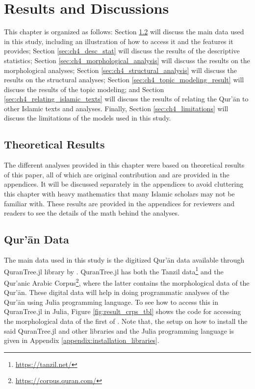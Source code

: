\chapter{Results and Discussions}\label{ch:results}
This chapter is organized as follows: Section \ref{sec:result_data} will discuss the main data used in this study, including an illustration of how to access it and the features it provides; Section \ref{sec:ch4_desc_stat} will discuss the results of the descriptive statistics; Section \ref{sec:ch4_morphological_analysis} will discuss the results on the morphological analyses; Section \ref{sec:ch4_structural_analysis} will discuss the results on the structural analyses; Section \ref{sec:ch4_topic_modeling_result} will discuss the results of the topic modeling; and Section \ref{sec:ch4_relating_islamic_texts} will discuss the results of relating the Qur'\=an to other Islamic texts and analyses. Finally, Section \ref{sec:ch4_limitations} will discuss the limitations of the models used in this study.
\section{Theoretical Results}
The different analyses provided in this chapter were based on theoretical results of this paper, all of which are original contribution and are provided in the appendices. It will be discussed separately in the appendices to avoid cluttering this chapter with heavy mathematics that many Islamic scholars may not be familiar with. These results are provided in the appendices for reviewers and readers to see the details of the math behind the analyses.
\section{Qur'\=an Data}\label{sec:result_data}
The main data used in this study is the digitized Qur'\=an data available through QuranTree.jl library by . QuranTree.jl has both the Tanzil data\footnote{\url{https://tanzil.net/}} and the Qur'anic Arabic Corpus\footnote{\url{https://corpus.quran.com/}}, where the latter contains the morphological data of the Qur'\=an. These digital data will help in doing programmatic analyses of the Qur'\=an using Julia programming language. To see how to access this in QuranTree.jl in Julia, Figure \ref{fig:result_crps_tbl} shows the code for accessing the morphological data of the first   of  . Note that, the setup on how to install the said QuranTree.jl and other libraries and the Julia programming language is given in Appendix \ref{appendix:installation_libraries}.

